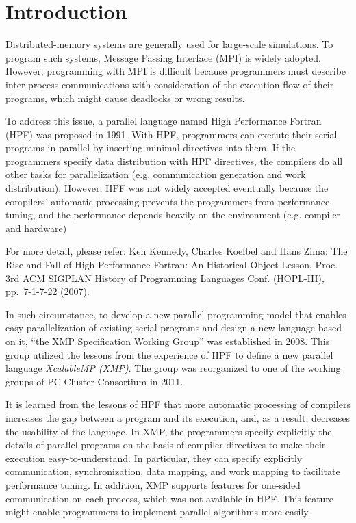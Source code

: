 \section{Introduction}

Distributed-memory systems are generally used for large-scale
simulations. To program such systems, Message Passing Interface (MPI) is
widely adopted. However, programming with MPI is difficult because
programmers must describe inter-process communications with
consideration of the execution flow of their programs, which might cause
deadlocks or wrong results.

To address this issue, a parallel language named High Performance
Fortran (HPF) was proposed in 1991. With HPF, programmers can execute their
serial programs in parallel by inserting minimal directives into
them. If the programmers specify data distribution with HPF directives,
the compilers do all other tasks for parallelization (e.g. communication
generation and work distribution). However, HPF was not widely accepted
eventually because the compilers' automatic processing prevents the
programmers from performance tuning, and the performance depends heavily
on the environment (e.g. compiler and hardware)

\begin{mynote}
  For more detail, please refer: Ken Kennedy, Charles Koelbel and Hans
  Zima: The Rise and Fall of High Performance Fortran: An Historical
  Object Lesson, Proc. 3rd ACM SIGPLAN History of Programming Languages
  Conf. (HOPL-III), pp.~7-1-7-22 (2007).
\end{mynote}

In such circumstance, to develop a new parallel programming model that
enables easy parallelization of existing serial programs and design a
new language based on it, ``the XMP Specification Working Group'' was
established in 2008. This group utilized the lessons from the experience
of HPF to define a new parallel language {\it XcalableMP (XMP)}. The
group was reorganized to one of the working groups of PC Cluster
Consortium in 2011.

It is learned from the lessons of HPF that more automatic processing of
compilers increases the gap between a program and its execution, and, as
a result, decreases the usability of the language.
%
In XMP, the programmers specify explicitly the details of parallel
programs on the basis of compiler directives to make their execution
easy-to-understand. In particular, they can specify explicitly
communication, synchronization, data mapping, and work mapping
to facilitate performance tuning. In addition, XMP supports features for
one-sided communication on each process, which was not available in
HPF. This feature might enable programmers to implement parallel
algorithms more easily.

